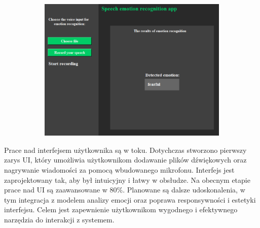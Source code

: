 \documentclass[12pt,titlepage]{article}
\begin{document}
\begin{figure}[ht]
\begin{subfigure}[b]{0.3\textwidth}
        \includegraphics[width=\textwidth]{img/3.png}
        \label{fig:sub3}
    \end{subfigure}
    \label{fig:main}
\end{figure}
Prace nad interfejsem użytkownika są w toku. Dotychczas stworzono pierwszy zarys UI, który umożliwia użytkownikom dodawanie plików dźwiękowych oraz nagrywanie wiadomości za pomocą wbudowanego mikrofonu. Interfejs jest zaprojektowany tak, aby był intuicyjny i łatwy w obsłudze. Na obecnym etapie prace nad UI są zaawansowane w 80\%. Planowane są dalsze udoskonalenia, w tym integracja z modelem analizy emocji oraz poprawa responsywności i estetyki interfejsu. Celem jest zapewnienie użytkownikom wygodnego i efektywnego narzędzia do interakcji z systemem.
\end{document}
